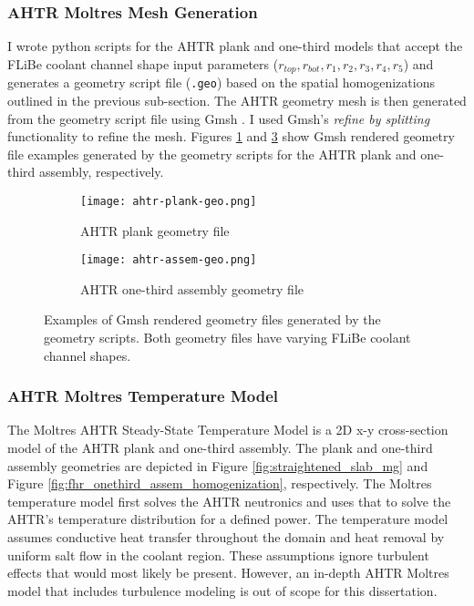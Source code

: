 \subsubsection{AHTR Moltres Mesh Generation}
I wrote python scripts for the \gls{AHTR} plank and one-third models that accept the 
\gls{FLiBe} coolant channel shape input parameters ($r_{top}, r_{bot}, r_1, r_2, 
r_3, r_4, r_5$) and generates a geometry script file (\texttt{.geo}) based on the 
spatial homogenizations outlined in the previous sub-section.
The AHTR geometry mesh is then generated from the geometry script file using 
Gmsh \cite{geuzaine_gmsh_2009}.
I used Gmsh's \textit{refine by splitting} functionality to refine the mesh. 
Figures \ref{fig:ahtr-plank-geo} and \ref{fig:ahtr-assem-geo} show Gmsh rendered 
geometry file examples generated by the geometry scripts for the AHTR plank 
and one-third assembly, respectively. 
\begin{figure}[htbp]
    \centering
    \begin{subfigure}{0.7\textwidth}
        \texttt{[image: ahtr-plank-geo.png]}
        \caption{AHTR plank geometry file}
        \label{fig:ahtr-plank-geo} 
    \end{subfigure}
    \begin{subfigure}{0.7\textwidth}
        \texttt{[image: ahtr-assem-geo.png]}
        \caption{AHTR one-third assembly geometry file}
        \label{fig:ahtr-assem-geo} 
    \end{subfigure}
    \caption{Examples of Gmsh rendered geometry files generated by the geometry scripts.
    Both geometry files have varying \gls{FLiBe} coolant channel shapes.}
\end{figure}

\subsubsection{AHTR Moltres Temperature Model}
\label{sec:ahtr-moltres-temperature-model}
The Moltres \gls{AHTR} Steady-State Temperature Model is a 2D x-y cross-section 
model of the \gls{AHTR} plank and one-third assembly.
The plank and one-third assembly geometries are depicted in
Figure \ref{fig:straightened_slab_mg} and Figure 
\ref{fig:fhr_onethird_assem_homogenization}, respectively.  
The Moltres temperature model first solves the \gls{AHTR} neutronics and uses that to 
solve the \gls{AHTR}'s temperature distribution for a defined power.
The temperature model assumes conductive heat transfer throughout the domain 
and heat removal by uniform salt flow in the coolant region. 
These assumptions ignore turbulent effects that would most likely be present. 
However, an in-depth AHTR Moltres model that includes turbulence modeling is 
out of scope for this dissertation. 

